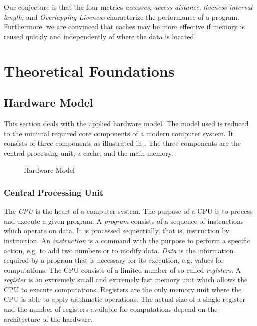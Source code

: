 \documentclass[onecolumn, openright, master, english, signatures]{dbrgrptt}
\begin{document}
Our conjecture is that the four metrics \emph{accesses}, \emph{access distance}, \emph{liveness interval length}, and \emph{Overlapping Liveness} characterize the performance of a program.
Furthermore, we are convinced that caches may be more effective if memory is reused quickly and independently of where the data is located.



\chapter{Theoretical Foundations}\label{cha:theoretical-foundations}


\section{Hardware Model}\label{sec:hardware-model}

This section deals with the applied hardware model. The model used is reduced to the minimal required core components of a modern computer system. It consists of three components as illustrated in . The three components are the central processing unit, a cache, and the main memory.

\begin{figure}[!ht]
  \centering
  
  \caption{Hardware Model}
  \label{fig:hardware-model}
\end{figure}

\subsection{Central Processing Unit}
The \emph{\ac{CPU}} is the heart of a computer system.
The purpose of a \ac{CPU} is to process and execute a given program.
A \emph{program} consists of a sequence of instructions which operate on data.
It is processed sequentially, that is, instruction by instruction.
An \emph{instruction} is a command with the purpose to perform a specific action, e.g. to add two numbers or to modify data.
\emph{Data} is the information required by a program that is necessary for its execution, e.g. values for computations.
The \ac{CPU} consists of a limited number of so-called \emph{registers}.
A \emph{register} is an extremely small and extremely fast memory unit which allows the \ac{CPU} to execute computations.
Registers are the only memory unit where the \ac{CPU} is able to apply arithmetic operations.
The actual size of a single register and the number of registers available for computations depend on the architecture of the hardware.
\end{document}
